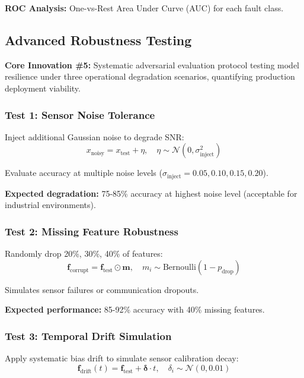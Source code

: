 \documentclass[11pt,a4paper]{article}
\begin{document}
\textbf{ROC Analysis:} One-vs-Rest Area Under Curve (AUC) for each fault class.

\subsection{Advanced Robustness Testing}

\begin{innovation}
\textbf{Core Innovation \#5:} Systematic adversarial evaluation protocol testing model resilience under three operational degradation scenarios, quantifying production deployment viability.
\end{innovation}

\subsubsection{Test 1: Sensor Noise Tolerance}

Inject additional Gaussian noise to degrade SNR:
\begin{equation}
x_{\text{noisy}} = x_{\text{test}} + \eta, \quad \eta \sim \mathcal{N}(0, \sigma^2_{\text{inject}})
\end{equation}

Evaluate accuracy at multiple noise levels ($\sigma_{\text{inject}} = 0.05, 0.10, 0.15, 0.20$).

\textbf{Expected degradation:} 75-85\% accuracy at highest noise level (acceptable for industrial environments).

\subsubsection{Test 2: Missing Feature Robustness}

Randomly drop 20\%, 30\%, 40\% of features:
\begin{equation}
\mathbf{f}_{\text{corrupt}} = \mathbf{f}_{\text{test}} \odot \mathbf{m}, \quad m_i \sim \text{Bernoulli}(1-p_{\text{drop}})
\end{equation}

Simulates sensor failures or communication dropouts.

\textbf{Expected performance:} 85-92\% accuracy with 40\% missing features.

\subsubsection{Test 3: Temporal Drift Simulation}

Apply systematic bias drift to simulate sensor calibration decay:
\begin{equation}
\mathbf{f}_{\text{drift}}(t) = \mathbf{f}_{\text{test}} + \boldsymbol{\delta} \cdot t, \quad \delta_i \sim \mathcal{N}(0, 0.01)
\end{equation}
\end{document}
